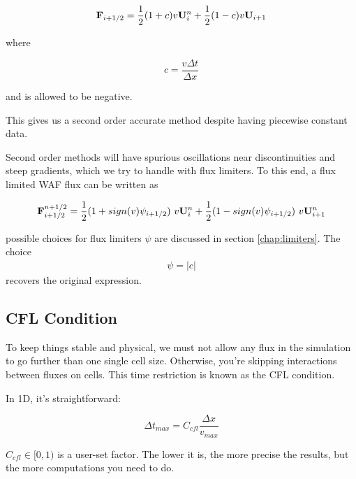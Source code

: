 \begin{equation}
	\mathbf{F}_{i+1/2} =  
		\frac{1}{2} (1 + c) v \mathbf{U}_i^n + \frac{1}{2} (1 - c) v \mathbf{U}_{i+1}
\end{equation}

where

\begin{equation}
	c = \frac{v \Delta t}{\Delta x}
\end{equation}

and is allowed to be negative.


This gives us a second order accurate method despite having piecewise constant data.

Second order methods will have spurious oscillations near discontinuities and steep gradients, which we try to handle with flux limiters.
To this end, a  flux limited WAF flux can be written as

\begin{equation}
	\mathbf{F}_{i+1/2}^{n+1/2} =  
		\frac{1}{2} (1 + sign(v) \psi_{i+1/2})\ v \mathbf{U}_i^n + \frac{1}{2} (1 - sign(v) \psi_{i+1/2})\ v \mathbf{U}_{i+1}^n
\end{equation}

possible choices for flux limiters $\psi$ are discussed in section \ref{chap:limiters}. 
The choice
\begin{align*}
	\psi = |c|
\end{align*}
recovers the original expression.









\subsection{CFL Condition}

To keep things stable and physical, we must not allow any flux in the simulation to go further than one single cell size.
Otherwise, you're skipping interactions between fluxes on cells.
This time restriction is known as the CFL condition.

In 1D, it's straightforward:

\begin{equation}
	\Delta t_{max} = C_{cfl} \frac{\Delta x}{v_{max}} \label{eq:CFL1D}
\end{equation}

$C_{cfl} \in [0, 1) $ is a user-set factor.
The lower it is, the more precise the results, but the more computations you need to do.

